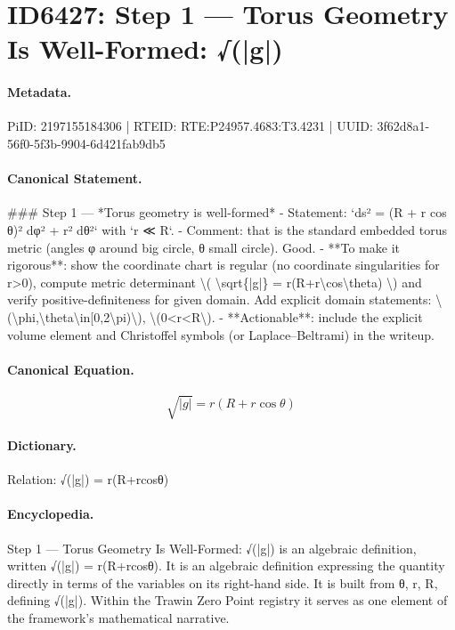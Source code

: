 \section*{ID6427: Step 1 — Torus Geometry Is Well-Formed: √(|g|)}
\paragraph{Metadata.}
PiID: 2197155184306 | RTEID: RTE:P24957.4683:T3.4231 | UUID: 3f62d8a1-56f0-5f3b-9904-6d421fab9db5

\paragraph{Canonical Statement.}
\#\#\# Step 1 — *Torus geometry is well-formed* - Statement: `ds² = (R + r cos θ)² dφ² + r² dθ²` with `r ≪ R`. - Comment: that is the standard embedded torus metric (angles φ around big circle, θ small circle). Good. - **To make it rigorous**: show the coordinate chart is regular (no coordinate singularities for r>0), compute metric determinant \textbackslash{}( \textbackslash{}sqrt\{|g|\} = r(R+r\textbackslash{}cos\textbackslash{}theta) \textbackslash{}) and verify positive-definiteness for given domain. Add explicit domain statements: \textbackslash{}(\textbackslash{}phi,\textbackslash{}theta\textbackslash{}in[0,2\textbackslash{}pi)\textbackslash{}), \textbackslash{}(0<r<R\textbackslash{}). - **Actionable**: include the explicit volume element and Christoffel symbols (or Laplace–Beltrami) in the writeup.

\paragraph{Canonical Equation.}
\[
\sqrt{|g|} = r(R+r\cos\theta)
\]

\paragraph{Dictionary.}
Relation: √(|g|) = r(R+rcosθ)

\paragraph{Encyclopedia.}
Step 1 — Torus Geometry Is Well-Formed: √(|g|) is an algebraic definition, written √(|g|) = r(R+rcosθ). It is an algebraic definition expressing the quantity directly in terms of the variables on its right-hand side. It is built from θ, r, R, defining √(|g|). Within the Trawin Zero Point registry it serves as one element of the framework's mathematical narrative.
